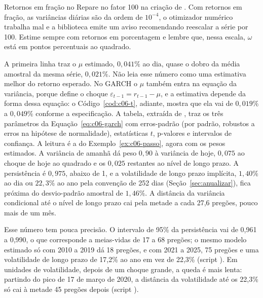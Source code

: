 \begin{armadilha}{Retornos em fração no }
Repare no fator 100 na criação de . Com retornos em fração, as variâncias diárias são da ordem de $10^{-4}$, o otimizador numérico trabalha mal e a biblioteca emite um aviso recomendando reescalar a série por 100. Estime sempre com retornos em porcentagem e lembre que, nessa escala, $\omega$ está em pontos percentuais ao quadrado.
\end{armadilha}

A primeira linha traz o $\mu$ estimado, $0,041\%$ ao dia, quase o dobro da média amostral da mesma série, $0,021\%$. Não leia esse número como uma estimativa melhor do retorno esperado. No GARCH o $\mu$ também entra na equação da variância, porque define o choque $\varepsilon_{t-1} = r_{t-1} - \mu$, e a estimativa depende da forma dessa equação: o Código~\ref{cod:c06-t}, adiante, mostra que ela vai de $0,019\%$ a $0,049\%$ conforme a especificação. A tabela, extraída de , traz os três parâmetros da Equação~\eqref{eq:c06-garch} com erros-padrão (por padrão, robustos a erros na hipótese de normalidade), estatísticas $t$, p-valores e intervalos de confiança. A leitura é a do Exemplo~\ref{ex:c06-passo}, agora com os pesos estimados. A variância de amanhã dá peso $0,90$ à variância de hoje, $0,075$ ao choque de hoje ao quadrado e os $0,025$ restantes ao nível de longo prazo. A persistência é $0,975$, abaixo de 1, e a volatilidade de longo prazo implícita, $1,40\%$ ao dia ou $22,3\%$ ao ano pela convenção de 252 dias (Seção~\ref{sec:anualizar}), fica próxima do desvio-padrão amostral de $1,46\%$. A distância da variância condicional até o nível de longo prazo cai pela metade a cada 27,6 pregões, pouco mais de um mês.

Esse número tem pouca precisão. O intervalo de 95\% da persistência vai de 0,961 a 0,990, o que corresponde a meias-vidas de 17 a 68 pregões; o mesmo modelo estimado só com 2010 a 2019 dá 18 pregões, e com 2021 a 2025, 75 pregões e uma volatilidade de longo prazo de 17,2\% ao ano em vez de 22,3\% (script ). Em unidades de volatilidade, depois de um choque grande, a queda é mais lenta: partindo do pico de 17 de março de 2020, a distância da volatilidade até os 22,3\% só cai à metade 45 pregões depois (script ).


